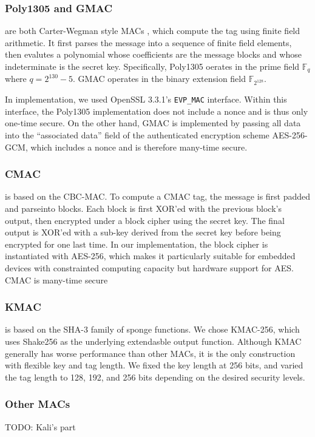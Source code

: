 \documentclass[runningheads]{llncs}
\begin{document}
\subsubsection{Poly1305 and GMAC} are both Carter-Wegman style MACs \cite{DBLP:journals/jcss/CarterW79,DBLP:journals/jcss/WegmanC81}, which compute the tag using finite field arithmetic. It first parses the message into a sequence of finite field elements, then evalutes a polynomial whose coefficients are the message blocks and whose indeterminate is the secret key. Specifically, Poly1305 oerates in the prime field $\mathbb{F}_q$ where $q = 2^{130} - 5$. GMAC operates in the binary extension field $\mathbb{F}_{2^{128}}$.

In implementation, we used OpenSSL 3.3.1's \texttt{EVP\_MAC} interface. Within this interface, the Poly1305 implementation does not include a nonce and is thus only one-time secure. On the other hand, GMAC is implemented by passing all data into the ``associated data'' field of the authenticated encryption scheme AES-256-GCM, which includes a nonce and is therefore many-time secure.

\subsubsection{CMAC} is based on the CBC-MAC. To compute a CMAC tag, the message is first padded and parseinto blocks. Each block is first XOR'ed with the previous block's output, then encrypted under a block cipher using the secret key. The final output is XOR'ed with a sub-key derived from the secret key before being encrypted for one last time. In our implementation, the block cipher is instantiated with AES-256, which makes it particularly suitable for embedded devices with constrainted computing capacity but hardware support for AES. CMAC is many-time secure

\subsubsection{KMAC} is based on the SHA-3 family of sponge functions. We chose KMAC-256, which uses Shake256 as the underlying extendasble output function. Although KMAC generally has worse performance than other MACs, it is the only construction with flexible key and tag length. We fixed the key length at 256 bits, and varied the tag length to 128, 192, and 256 bits depending on the desired security levels.

\subsubsection{Other MACs} TODO: Kali's part
\end{document}

